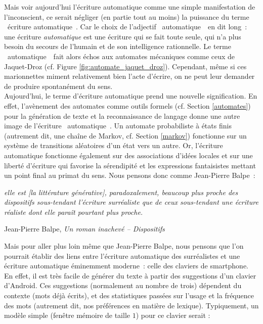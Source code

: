 \documentclass{article}
\newenvironment{citationbox}
{\begin{center}
		\begin{minipage}{.8\textwidth}
		}
		{
		\end{minipage}	
\end{center}
}
\begin{document}
				Mais voir aujourd’hui l'écriture automatique comme une simple manifestation de l'inconscient, ce serait négliger (en partie tout au moins) la puissance du terme \guillemotleft~écriture automatique~\guillemotright. Car le choix de l'adjectif \guillemotleft~automatique~\guillemotright~en dit long~: une écriture \textit{automatique} est une écriture qui se fait toute seule, qui n'a plus besoin du secours de l'humain et de son intelligence rationnelle. Le terme \guillemotleft~automatique~\guillemotright~fait alors échos aux automates mécaniques comme ceux de Jaquet-Droz (cf. Figure \ref{fig:automate_jaquet_droz}). Cependant, même si ces marionnettes miment relativement bien l'acte d'écrire, on ne peut leur demander de produire spontanément du sens.\\
				
				Aujourd'hui, le terme d'écriture automatique prend une nouvelle signification. En effet, l'avènement des automates comme outils formels (cf. Section \ref{automates}) pour la génération de texte et la reconnaissance de langage donne une autre image de l'écriture \guillemotleft~automatique~\guillemotright. Un automate probabiliste à états finis (autrement dit, une chaîne de Markov, cf. Section \ref{markov}) fonctionne sur un système de transitions aléatoires d'un état vers un autre. Or, l'écriture automatique fonctionne également sur des associations d'idées locales et sur une liberté d'écriture qui favorise la sérendipité et les expressions fantaisistes mettant un point final au primat du sens. Nous pensons donc comme Jean-Pierre Balpe~:
				\begin{citationbox}
					\textit{elle est [la littérature générative], paradoxalement, beaucoup plus proche des dispositifs sous-tendant l'écriture surréaliste que de ceux sous-tendant une écriture réaliste dont elle paraît pourtant plus proche.}\\
					\begin{flushleft}
						Jean-Pierre Balpe, \textit{Un roman inachevé -- Dispositifs}\autocite{balpe1994}
					\end{flushleft}
				\end{citationbox}
				Mais pour aller plus loin même que Jean-Pierre Balpe, nous pensons que l'on pourrait établir des liens entre l'écriture automatique des surréalistes et une écriture automatique éminemment moderne~: celle des claviers de smartphone. En effet, il est très facile de générer du texte à partir des suggestions d'un clavier d'Android. Ces suggestions (normalement au nombre de trois) dépendent du contexte (mots déjà écrits), et des statistiques passées sur l'usage et la fréquence des mots (autrement dit, nos préférences en matière de lexique). Typiquement, un modèle simple (fenêtre mémoire de taille $1$) pour ce clavier serait :
\end{document}
